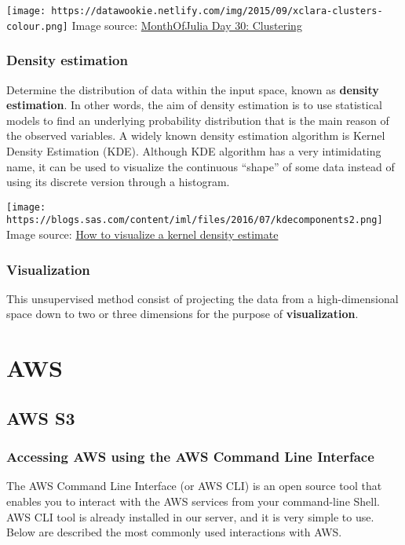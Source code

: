 \documentclass[]{book}
\begin{document}
\texttt{[image: https://datawookie.netlify.com/img/2015/09/xclara-clusters-colour.png]}
Image source:
\href{https://datawookie.netlify.com/blog/2015/10/monthofjulia-day-30-clustering/}{MonthOfJulia
Day 30: Clustering}

\subsection{Density estimation}\label{density-estimation}

Determine the distribution of data within the input space, known as
\textbf{density estimation}. In other words, the aim of density
estimation is to use statistical models to find an underlying
probability distribution that is the main reason of the observed
variables. A widely known density estimation algorithm is Kernel Density
Estimation (KDE). Although KDE algorithm has a very intimidating name,
it can be used to visualize the continuous ``shape'' of some data
instead of using its discrete version through a histogram.

\texttt{[image: https://blogs.sas.com/content/iml/files/2016/07/kdecomponents2.png]}
Image source:
\href{https://blogs.sas.com/content/iml/2016/07/27/visualize-kernel-density-estimate.html}{How
to visualize a kernel density estimate}

\subsection{Visualization}\label{visualization}

This unsupervised method consist of projecting the data from a
high-dimensional space down to two or three dimensions for the purpose
of \textbf{visualization}.

\chapter{AWS}\label{aws}

\section{AWS S3}\label{aws-s3}

\subsection{Accessing AWS using the AWS Command Line
Interface}\label{accessing-aws-using-the-aws-command-line-interface}

The AWS Command Line Interface (or AWS CLI) is an open source tool that
enables you to interact with the AWS services from your command-line
Shell. AWS CLI tool is already installed in our server, and it is very
simple to use. Below are described the most commonly used interactions
with AWS.
\end{document}
